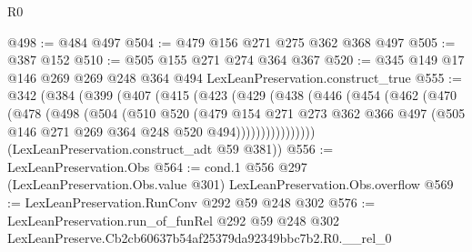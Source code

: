 \begin{lexlean}{R0}
\begin{coremodule}
@498 := @484 @497
@504 := @479 @156 @271 @275 @362 @368 @497
@505 := @387 @152
@510 := @505 @155 @271 @274 @364 @367
@520 := @345 @149 @17 @146 @269 @269 @248 @364 @494 LexLeanPreservation.construct_true
@555 := @342
    (@384
      (@399
        (@407
          (@415
            (@423
              (@429
                (@438
                  (@446
                    (@454
                      (@462
                        (@470
                          (@478
                            (@498
                              (@504
                                (@510
                                  @520
                                  (@479
                                    @154
                                    @271
                                    @273
                                    @362
                                    @366
                                    @497
                                    (@505 @146 @271 @269 @364 @248 @520 @494))))))))))))))))
      (LexLeanPreservation.construct_adt @59 @381))
@556 := LexLeanPreservation.Obs
@564 := cond.{1} @556 @297 (LexLeanPreservation.Obs.value @301) LexLeanPreservation.Obs.overflow
@569 := LexLeanPreservation.RunConv @292 @59 @248 @302
@576 := LexLeanPreservation.run_of_funRel
    @292
    @59
    @248
    @302
    LexLeanPreserve.Cb2cb60637b54af25379da92349bbc7b2.R0.__rel_0
\end{coremodule}
\end{lexlean}
